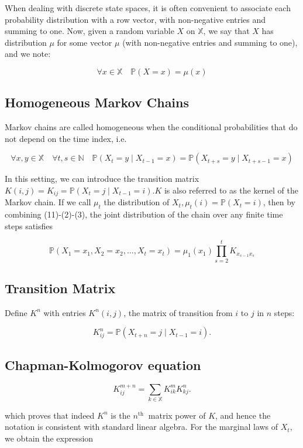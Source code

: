 \documentclass[10pt]{article}
\begin{document}
When dealing with discrete state spaces, it is often convenient to associate each probability distribution with a row vector, with non-negative entries and summing to one. Now, given a random variable $X$ on $\mathbb{X}$, we say that $X$ has distribution $\mu$ for some vector $\mu$ (with non-negative entries and summing to one), and we note:

$$
\forall x \in \mathbb{X} \quad \mathbb{P}(X=x)=\mu(x)
$$

\subsection{Homogeneous Markov Chains}
Markov chains are called homogeneous when the conditional probabilities that do not depend on the time index, i.e.

$$
\forall x, y \in \mathbb{X} \quad \forall t, s \in \mathbb{N} \quad \mathbb{P}\left(X_{t}=y \mid X_{t-1}=x\right)=\mathbb{P}\left(X_{t+s}=y \mid X_{t+s-1}=x\right)
$$

In this setting, we can introduce the transition matrix $K(i, j)=K_{i j}=\mathbb{P}\left(X_{t}=j \mid X_{t-1}=i\right) . K$ is also referred to as the kernel of the Markov chain. If we call $\mu_{t}$ the distribution of $X_{t}, \mu_{t}(i)=\mathbb{P}\left(X_{t}=i\right)$, then by combining (11)-(2)-(3), the joint distribution of the chain over any finite time steps satisfies

$$
\mathbb{P}\left(X_{1}=x_{1}, X_{2}=x_{2}, \ldots, X_{t}=x_{t}\right)=\mu_{1}\left(x_{1}\right) \prod_{s=2}^{t} K_{x_{s-1} x_{s}}
$$

\subsection{Transition Matrix}
Define $K^{n}$ with entries $K^{n}(i, j)$, the matrix of transition from $i$ to $j$ in $n$ steps:

$$
K_{i j}^{n}=\mathbb{P}\left(X_{t+n}=j \mid X_{t-1}=i\right) .
$$

 \subsection{Chapman-Kolmogorov equation}

$$
K_{i j}^{m+n}=\sum_{k \in \mathbb{X}} K_{i k}^{m} K_{k j}^{n} .
$$

which proves that indeed $K^{n}$ is the $n^{\text {th }}$ matrix power of $K$, and hence the notation is consistent with standard linear algebra. For the marginal laws of $X_{t}$, we obtain the expression
\end{document}
